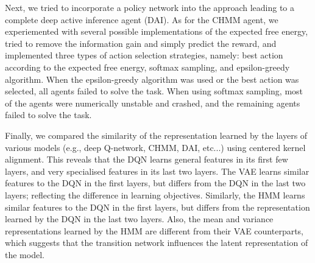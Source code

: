\documentclass[twoside,11pt]{article}
\begin{document}
Next, we tried to incorporate a policy network into the approach leading to a complete deep active inference agent (DAI). As for the CHMM agent, we experiemented with several possible implementations of the expected free energy, tried to remove the information gain and simply predict the reward, and implemented three types of action selection strategies, namely: best action according to the expected free energy, softmax sampling, and epsilon-greedy algorithm. When the epsilon-greedy algorithm was used or the best action was selected, all agents failed to solve the task. When using softmax sampling, most of the agents were numerically unstable and crashed, and the remaining agents failed to solve the task. 

Finally, we compared the similarity of the representation learned by the layers of various models (e.g., deep Q-network, CHMM, DAI, etc...) using centered kernel alignment. This reveals that the DQN learns general features in its first few layers, and very specialised features in its last two layers. The VAE learns similar features to the DQN in the first layers, but differs from the DQN in the last two layers; reflecting the difference in learning objectives. Similarly, the HMM learns similar features to the DQN in the first layers, but differs from the representation learned by the DQN in the last two layers. Also, the mean and variance representations learned by the HMM are different from their VAE counterparts, which suggests that the transition network influences the latent representation of the model.
\end{document}
